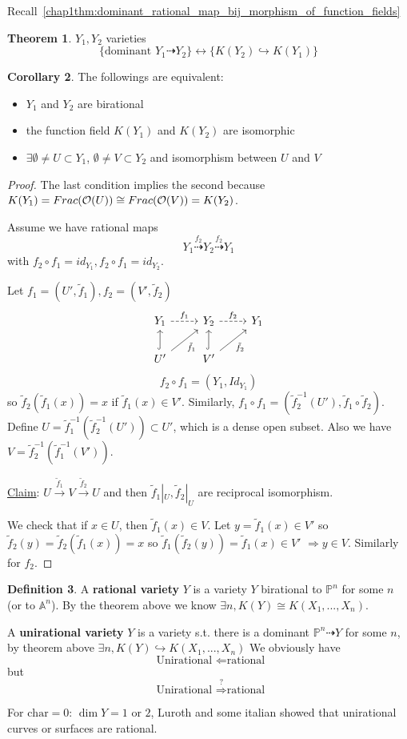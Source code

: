 \documentclass[11pt]{article}
\theoremstyle{definition}
\newtheorem{thm}{Theorem}[section]
\newtheorem{cor}[thm]{Corollary}
\newtheorem{dfn}[thm]{Definition}
\newcommand{\affn}{\mathbb A}
\newcommand{\proj}{\mathbb P}
\newcommand{\calo}{{\cal O}}
\newcommand{\drta}{\dashrightarrow}
\newcommand{\Lrta}{\Longrightarrow}
\newcommand{\lrta}{\longrightarrow}
\newcommand{\llrta}{\longleftrightarrow}
\newcommand{\Llta}{\Longleftarrow}
\newcommand{\inj}{\hookrightarrow}
\begin{document}
Recall~\ref{chap1thm:dominant_rational_map_bij_morphism_of_function_fields}
\begin{thm} $Y_1,Y_2$ varieties
$$\{ \text{dominant }Y_1\dashrightarrow Y_2\}\llrta\{K(Y_2)\inj K(Y_1)\}$$
\end{thm}
\begin{cor}The followings are equivalent:
\begin{itemize}
	\item
$Y_1$  and $Y_2$ are birational \item the function field $K(Y_1)$ and $K(Y_2)$ are isomorphic
\item $\exists \emptyset \neq U\subset Y_1$, $\emptyset \neq V\subset Y_2$ and isomorphism between $U$ and $V$
\end{itemize}
\end{cor}
\begin{proof}
The last condition implies the second because $K(Y_1)=Frac(\calo(U))\cong Frac(\calo(V))=K(Y_2)$. 

Assume we have rational maps 
$$
Y_1\overset{f_2}{\drta}Y_2\overset{f_2}{\drta} Y_1
$$
with $f_2\circ f_1=id_{Y_1}, f_2\circ f_1= id_{Y_2}$. 

Let $f_1=(U',\tilde{f}_1), f_2=(V',\tilde{f}_2)$
\[
\begin{tikzcd}
Y_1 \arrow[r, dashed,"f_1"] & Y_2 \arrow[r, dashed,"f_2"] & Y_1 \\
U' \arrow[ru, "\tilde{f}_1"'] \arrow[u,hook] & V' \arrow[ru, "\tilde{f}_2"'] \arrow[u, hook] & 
\end{tikzcd}
\]
$$
f_2\circ f_1=(Y_1,Id_{Y_1})
$$
so $\tilde{f}_2(\tilde{f}_1(x))=x$ if $\tilde{f}_1(x)\in V'$.
Similarly, $f_1\circ f_1=(\tilde{f}_2^{-1}(U'),\tilde{f}_1\circ \tilde{f}_2)$. Define $U=\tilde{f}^{-1}_{1}(\tilde{f}_{2}^{-1}(U'))\subset U'$, which is a dense open subset. Also we have $V=\tilde{f}^{-1}_{2}(\tilde{f}_{1}^{-1}(V'))$.

\underline{Claim}: $U\overset{\tilde{f}_1}{\lrta }V\overset{\tilde{f}_2}{\lrta} U$ and then $\tilde{f}_1|_U,\tilde{f}_2|_U$ are reciprocal isomorphism.

We check that if $x\in  U$, then $\tilde{f}_1(x)\in V$.
Let $y=\tilde{f}_1(x)\in V'$ so $\tilde{f}_2(y)=\tilde{f}_2(\tilde{f}_1(x))=x$ so $\tilde{f}_1(\tilde{f}_2(y))=\tilde{f}_1(x)\in V'$ $\Lrta y\in V$. Similarly for $f_2$.
\end{proof}

\begin{dfn}
A \textbf{rational variety} $Y$ is a variety $Y$ birational to $\proj^n$ for some $n$ (or to $\affn^n$). By the theorem above we know $\exists n, K(Y)\cong K(X_1,...,X_n)$. 

A \textbf{unirational variety} $Y$ is a variety s.t. there is a dominant $\proj^n\drta Y$ for some $n$, by theorem above $\exists n, K(Y)\inj K(X_1,...,X_n)$
We obviously have
$$
\text{ Unirational } \Llta \text{rational}
$$
but 
$$
\text{ Unirational } \overset{?}{\Lrta} \text{rational}
$$
\end{dfn}
For $\text{char}= 0$: $\dim Y=1$ or $2$, Luroth and some italian showed that unirational curves or surfaces are rational.
\end{document}
